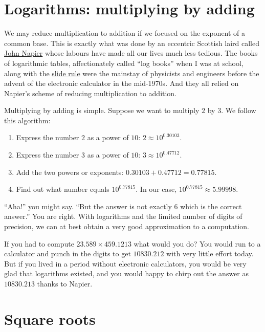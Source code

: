\documentclass[
  a4paper,
]{article}
\begin{document}
\hypertarget{logarithms-multiplying-by-adding}{%
\section{Logarithms: multiplying by
adding}\label{logarithms-multiplying-by-adding}}

We may reduce multiplication to addition if we focused on the exponent
of a common base. This is exactly what was done by an eccentric Scottish
laird called
\href{http://www-history.mcs.st-andrews.ac.uk/Biographies/Napier.html}{John
Napier} whose labours have made all our lives much less tedious. The
books of logarithmic tables, affectionately called ``log books'' when I
was at school, along with the \href{http://sliderulemuseum.com/}{slide
rule} were the mainstay of physicists and engineers before the advent of
the electronic calculator in the mid-1970s. And they all relied on
Napier's scheme of reducing multiplication to addition.

Multiplying by adding is simple. Suppose we want to multiply \(2\) by
\(3\). We follow this algorithm:

\begin{enumerate}
\item
  Express the number \(2\) as a power of \(10\):
  \(2 \approx 10^{0.30103}\).
\item
  Express the number \(3\) as a power of \(10\):
  \(3 \approx 10^{0.47712}\).
\item
  Add the two powers or exponents: \(0.30103 + 0.47712 = 0.77815\).
\item
  Find out what number equals \(10^{0.77815}\). In our case,
  \(10^{0.77815} \approx 5.99998\).
\end{enumerate}

``Aha!'' you might say. ``But the answer is not exactly \(6\) which is
the correct answer.'' You are right. With logarithms and the limited
number of digits of precision, we can at best obtain a very good
approximation to a computation.

If you had to compute \(23.589 \times 459.1213\) what would you do? You
would run to a calculator and punch in the digits to get \(10830.212\)
with very little effort today. But if you lived in a period without
electronic calculators, you would be very glad that logarithms existed,
and you would happy to chirp out the answer as \(10830.213\) thanks to
Napier.

\hypertarget{square-roots}{%
\section{Square roots}\label{square-roots}}
\end{document}
